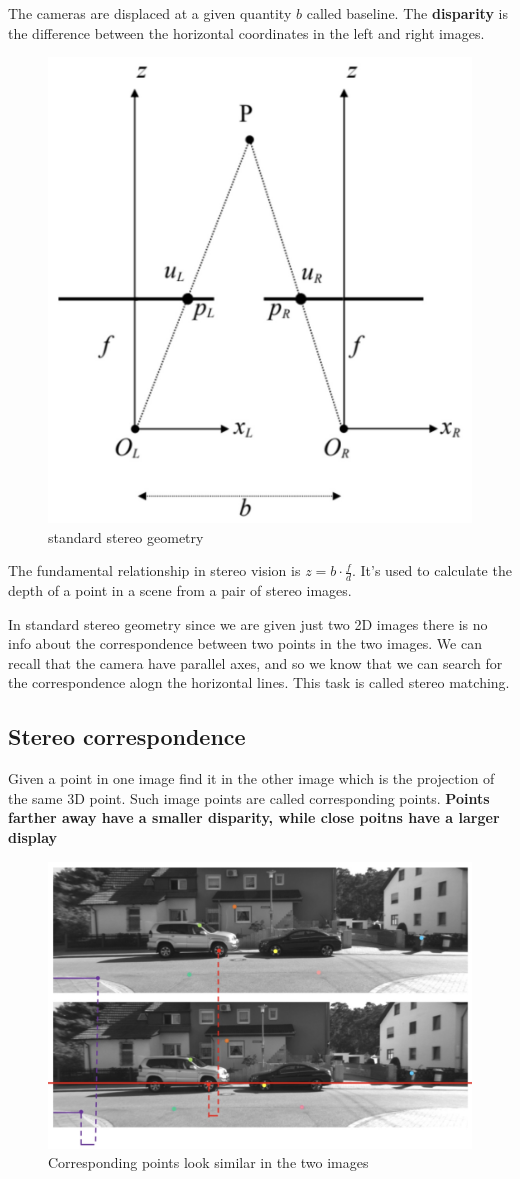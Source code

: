 \documentclass{article}
\begin{document}
The cameras are displaced at a given quantity $b$ called baseline.
The \textbf{disparity} is the difference between the horizontal coordinates in the left and right images.

\begin{figure}[htbp]
  \centering
  \includegraphics[width=0.45\linewidth]{./img/standard_stereo_geometry.jpg}
  \caption{standard stereo geometry}
  \label{fig:standard_stereo_geometry}
\end{figure}

The fundamental relationship in stereo vision is $z = b \cdot \frac{f}{d}$.
It's used to calculate the depth of a point in a scene from a pair of stereo images.

In standard stereo geometry since we are given just two 2D images there is no info about the correspondence between two points in the two images.
We can recall that the camera have parallel axes, and so we know that we can search for the correspondence alogn the horizontal lines.
This task is called stereo matching.

\subsection{Stereo correspondence}
Given a point in one image find it in the other image which is the projection of the same 3D point.
Such image points are called corresponding points.
\textbf{Points farther away have a smaller disparity, while close poitns have a larger display}

\begin{figure}[htbp]
  \centering
  \includegraphics[width=0.65\linewidth]{./img/stereo_correspondence.jpg}
  \caption{Corresponding points look similar in the two images}
  \label{fig:stereo_correspondence}
\end{figure}
\end{document}
